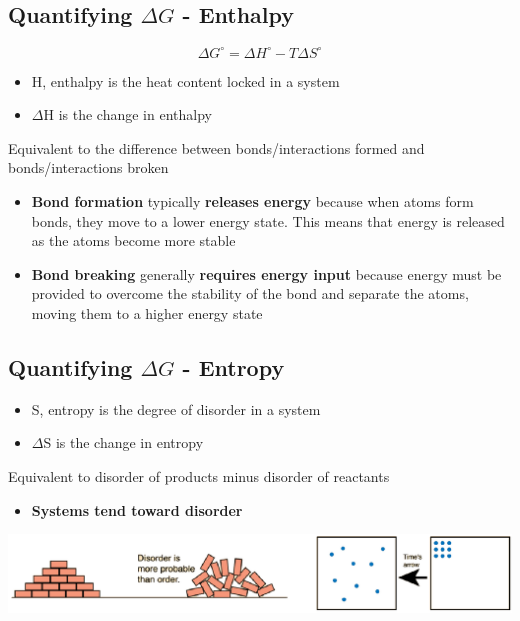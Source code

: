 \documentclass[10pt]{article}
\begin{document}
\subsection*{Quantifying $\Delta G$ - Enthalpy}
\[\Delta G^\circ = \Delta H^\circ - T\Delta S^\circ\]
\begin{itemize}
    \item H, enthalpy is the heat content locked in a system
    \item $\Delta$H is the change in enthalpy
\end{itemize}
Equivalent to the difference between bonds/interactions formed and bonds/interactions broken
\begin{itemize}
    \item \textbf{Bond formation} typically \textbf{releases energy} because when atoms form bonds, they move to a lower energy state.  This means that energy is released as the atoms become more stable
    \item \textbf{Bond breaking} generally \textbf{requires energy input} because energy must be provided to overcome the stability of the bond and separate the atoms, moving them to a higher energy state
\end{itemize}

\subsection*{Quantifying $\Delta G$ - Entropy}
\begin{itemize}
    \item S, entropy is the degree of disorder in a system
    \item $\Delta$S is the change in entropy
\end{itemize}
Equivalent to disorder of products minus disorder of reactants
\begin{itemize}
    \item \textbf{Systems tend toward disorder}
\end{itemize}
\begin{center}
    \includegraphics[width=\textwidth]{L3_13.png}
\end{center}
\end{document}
